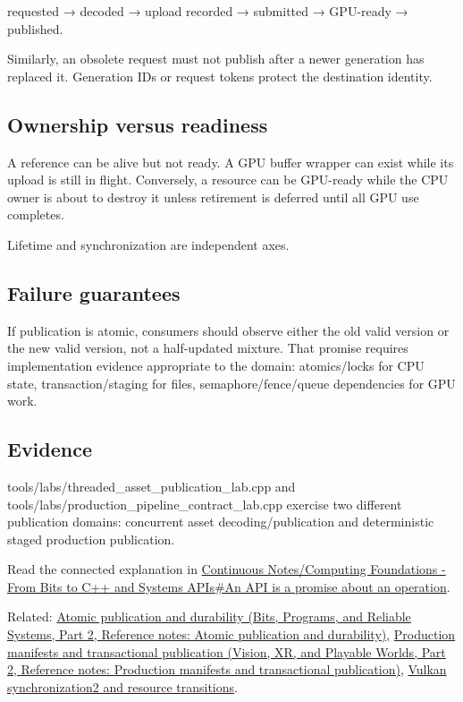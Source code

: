 requested → decoded → upload recorded → submitted → GPU-ready → published.

Similarly, an obsolete request must not publish after a newer generation has replaced it. Generation IDs or request tokens protect the destination identity.

\subsection{Ownership versus readiness}\label{appendix-fdae7ff0a23f-ownership-versus-readiness}

\hypertarget{appendix-fdae7ff0a23f-ownership-versus-readiness}{}

A reference can be alive but not ready. A GPU buffer wrapper can exist while its upload is still in flight. Conversely, a resource can be GPU-ready while the CPU owner is about to destroy it unless retirement is deferred until all GPU use completes.

Lifetime and synchronization are independent axes.

\subsection{Failure guarantees}\label{appendix-fdae7ff0a23f-failure-guarantees}

\hypertarget{appendix-fdae7ff0a23f-failure-guarantees}{}

If publication is atomic, consumers should observe either the old valid version or the new valid version, not a half-updated mixture. That promise requires implementation evidence appropriate to the domain: atomics/locks for CPU state, transaction/staging for files, semaphore/fence/queue dependencies for GPU work.

\subsection{Evidence}\label{appendix-fdae7ff0a23f-evidence}

\hypertarget{appendix-fdae7ff0a23f-evidence}{}

tools/labs/threaded\_asset\_publication\_lab.cpp and tools/labs/production\_pipeline\_contract\_lab.cpp exercise two different publication domains: concurrent asset decoding/publication and deterministic staged production publication.

Read the connected explanation in \hyperref[01-foundations-i-ch008-an-api-is-a-promise-about-an-operation]{Continuous Notes/Computing Foundations - From Bits to C++ and Systems APIs\#An API is a promise about an operation}.

Related: \href{../01-Bits-Programs-and-Reliable-Systems-P02/main.pdf\#appendix-e89a8f290ef5}{Atomic publication and durability (Bits, Programs, and Reliable Systems, Part 2, Reference notes: Atomic publication and durability)}, \href{../07-Vision-XR-and-Playable-Worlds-P02/main.pdf\#appendix-91eaa3cbdbc3}{Production manifests and transactional publication (Vision, XR, and Playable Worlds, Part 2, Reference notes: Production manifests and transactional publication)}, \hyperref[appendix-f15ce0d9c170]{Vulkan synchronization2 and resource transitions}.
